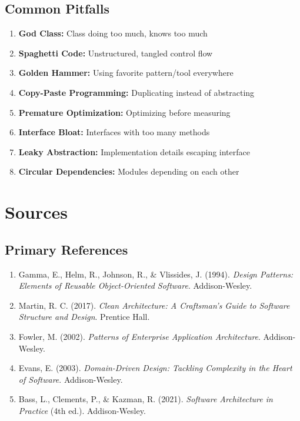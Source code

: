\documentclass[11pt,letterpaper]{article}
\begin{document}
\subsection{Common Pitfalls}

\begin{warningbox}
\begin{enumerate}[nosep]
    \item \textbf{God Class:} Class doing too much, knows too much
    \item \textbf{Spaghetti Code:} Unstructured, tangled control flow
    \item \textbf{Golden Hammer:} Using favorite pattern/tool everywhere
    \item \textbf{Copy-Paste Programming:} Duplicating instead of abstracting
    \item \textbf{Premature Optimization:} Optimizing before measuring
    \item \textbf{Interface Bloat:} Interfaces with too many methods
    \item \textbf{Leaky Abstraction:} Implementation details escaping interface
    \item \textbf{Circular Dependencies:} Modules depending on each other
\end{enumerate}
\end{warningbox}

\section{Sources}

\subsection{Primary References}

\begin{enumerate}
    \item Gamma, E., Helm, R., Johnson, R., \& Vlissides, J. (1994). \textit{Design Patterns: Elements of Reusable Object-Oriented Software}. Addison-Wesley.
    
    \item Martin, R. C. (2017). \textit{Clean Architecture: A Craftsman's Guide to Software Structure and Design}. Prentice Hall.
    
    \item Fowler, M. (2002). \textit{Patterns of Enterprise Application Architecture}. Addison-Wesley.
    
    \item Evans, E. (2003). \textit{Domain-Driven Design: Tackling Complexity in the Heart of Software}. Addison-Wesley.
    
    \item Bass, L., Clements, P., \& Kazman, R. (2021). \textit{Software Architecture in Practice} (4th ed.). Addison-Wesley.
\end{enumerate}
\end{document}
